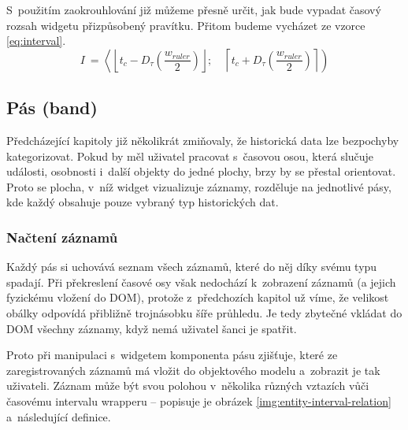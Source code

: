 			 S~použitím zaokrouhlování již můžeme přesně určit, jak bude vypadat časový rozsah widgetu přizpůsobený pravítku. Přitom budeme vycházet ze vzorce \ref{eq:interval}.
				\begin{equation}
				 I~= \left\langle \left\lfloor t_c - D_\tau \left(\frac{w_{ruler}}{2}\right) \right\rfloor;\quad \left\lceil t_c + D_\tau\left(\frac{w_{ruler}}{2}\right)\right\rceil\right)
				\end{equation}
			
		\subsection{Pás (band)}
			\label{band}
			Předcházející kapitoly již několikrát zmiňovaly, že historická data lze bezpochyby kategorizovat. Pokud by měl uživatel pracovat s~časovou osou, která slučuje události, osobnosti i~další objekty do jedné plochy, brzy by se přestal orientovat. Proto se plocha, v~níž widget vizualizuje záznamy, rozděluje na jednotlivé pásy, kde každý obsahuje pouze vybraný typ historických dat. 
			
			\subsubsection*{Načtení záznamů}
				\label{nacteni-zaznamu}
				Každý pás si uchovává seznam všech záznamů, které do něj díky svému typu spadají. Při překreslení časové osy však nedochází k~zobrazení záznamů (a jejich fyzickému vložení do DOM), protože z~předchozích kapitol už víme, že velikost obálky odpovídá přibližně trojnásobku šíře průhledu. Je tedy zbytečné vkládat do DOM všechny záznamy, když nemá uživatel šanci je spatřit.
				
				Proto při manipulaci s~widgetem komponenta pásu zjišťuje, které ze zaregistrovaných záznamů má vložit do objektového modelu a~zobrazit je tak uživateli. Záznam může být svou polohou v~několika různých vztazích vůči časovému intervalu wrapperu -- popisuje je obrázek \ref{img:entity-interval-relation} a~následující definice.
				
